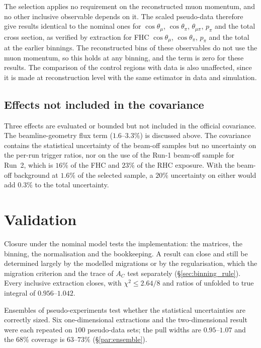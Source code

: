 \documentclass[11pt,a4paper]{article}
\begin{document}
The selection applies no requirement on the reconstructed muon momentum, and no other inclusive
observable depends on it. The scaled pseudo-data therefore give results identical to the nominal ones
for $\cos\theta_\mu$, $\cos\theta_\pi$, $\theta_{\mu\pi}$, $p_\pi$ and the total cross section, as
verified by extraction for FHC $\cos\theta_\mu$, $\cos\theta_\pi$, $p_\pi$ and the total at the earlier
binnings. The reconstructed bins of these observables do not use the muon momentum, so this holds
at any binning, and the term is zero for these results. The comparison of the control regions with data is also unaffected,
since it is made at reconstruction level with the same estimator in data and simulation.

\subsection{Effects not included in the covariance}
\label{sec:notincov}

Three effects are evaluated or bounded but not included in the official covariance.
The beamline-geometry flux term ($1.6$--$3.3\%$) is discussed above. The covariance contains the
statistical uncertainty of the beam-off samples but no uncertainty on the per-run trigger ratios, nor
on the use of the Run-1 beam-off sample for Run~2, which is $16\%$ of the FHC and $23\%$ of the RHC
exposure. With the beam-off background at $1.6\%$ of the selected sample, a $20\%$ uncertainty on
either would add $0.3\%$ to the total uncertainty.


\section{Validation}
\label{sec:validation}

Closure under the nominal model tests the implementation: the matrices, the binning, the
normalisation and the bookkeeping. A result can close and still be determined largely by the modelled
migrations or by the regularisation, which the migration criterion and the trace of $A_C$ test
separately (\S\ref{sec:binning_rule}). Every inclusive extraction closes, with $\chi^2\le2.64/8$ and
ratios of unfolded to true integral of $0.956$--$1.042$.

Ensembles of pseudo-experiments test whether the statistical uncertainties are correctly sized. Six
one-dimensional extractions and the two-dimensional result were each repeated on $100$ pseudo-data sets;
the pull widths are $0.95$--$1.07$ and the $68\%$ coverage is $63$--$73\%$ (\S\ref{par:ensemble}).
\end{document}
